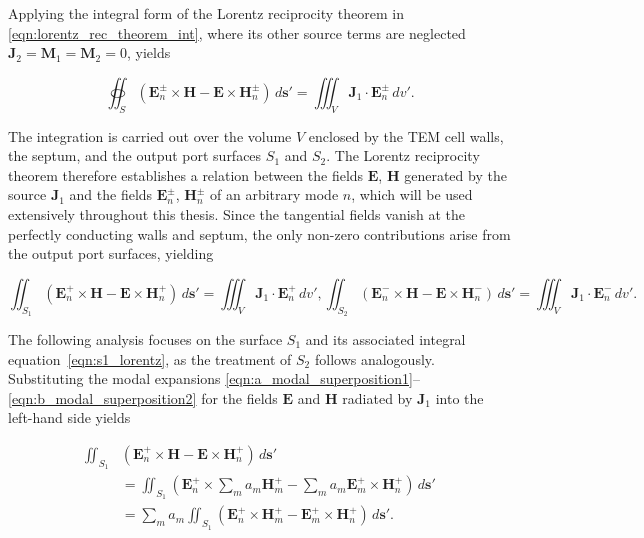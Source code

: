 Applying the integral form of the Lorentz reciprocity theorem in \eqref{eqn:lorentz_rec_theorem_int}, where its other source terms are neglected $\mathbf{J}_2=\mathbf{M}_1=\mathbf{M}_2=0$, yields

\begin{equation}
	\oiint _S (\mathbf{E}_n^\pm\times \mathbf{H}-\mathbf{E}\times \mathbf{H}_n^\pm)\,d\mathbf{s'}=\iiint_V \mathbf{J}_1\cdot\mathbf{E}_n^\pm\,dv'.
	\label{eqn:J1_propagating_waves}
\end{equation}

The integration is carried out over the volume $V$ enclosed by the TEM cell walls, the septum, and the output port surfaces $S_1$ and $S_2$. The Lorentz reciprocity theorem therefore establishes a relation between the fields $\mathbf{E}$, $\mathbf{H}$ generated by the source $\mathbf{J}_1$ and the fields $\mathbf{E}_n^\pm$, $\mathbf{H}_n^\pm$ of an arbitrary mode $n$, which will be used extensively throughout this thesis. Since the tangential fields vanish at the perfectly conducting walls and septum, the only non-zero contributions arise from the output port surfaces, yielding

\begin{subequations}
	\begin{equation}
		\iint_{S_1} \left(\mathbf{E}_n^+\times \mathbf{H}-\mathbf{E}\times 
		\mathbf{H}_n^+\right)\,d\mathbf{s}' = 
		\iiint_V \mathbf{J}_1\cdot\mathbf{E}_n^+\,dv',
		\label{eqn:s1_lorentz}
	\end{equation}
	\begin{equation}
		\iint_{S_2} \left(\mathbf{E}_n^-\times \mathbf{H}-\mathbf{E}\times 
		\mathbf{H}_n^-\right)\,d\mathbf{s}' = 
		\iiint_V \mathbf{J}_1\cdot\mathbf{E}_n^-\,dv'.
	\end{equation}
\end{subequations}

The following analysis focuses on the surface $S_1$ and its associated integral 
equation~\eqref{eqn:s1_lorentz}, as the treatment of $S_2$ follows analogously. 
Substituting the modal expansions \eqref{eqn:a_modal_superposition1}--\eqref{eqn:b_modal_superposition2} 
for the fields $\mathbf{E}$ and $\mathbf{H}$ radiated by $\mathbf{J}_1$ into the 
left-hand side yields

\begin{align}
	\iint_{S_1} &\left(\mathbf{E}_n^+\times \mathbf{H}-\mathbf{E}\times \mathbf{H}_n^+\right)
	\,d\mathbf{s}' \nonumber\\
	&= \iint_{S_1} \left(\mathbf{E}_n^+\times \sum_m a_m\mathbf{H}_m^+
	-\sum_m a_m\mathbf{E}_m^+\times \mathbf{H}_n^+\right)\,d\mathbf{s}' \nonumber\\
	&= \sum_m a_m \iint_{S_1} \left(\mathbf{E}_n^+\times \mathbf{H}_m^+
	-\mathbf{E}_m^+\times \mathbf{H}_n^+\right)\,d\mathbf{s}'.
\end{align}

